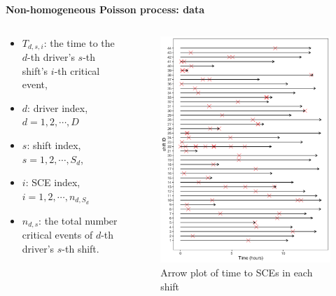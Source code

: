 \begin{frame}{\textbf{Non-homogeneous Poisson process: data}}
\begin{columns}
\begin{column}{.64\textwidth}
\begin{itemize}
\item $T_{d, s, i}$: the time to the $d$-th driver's $s$-th shift's $i$-th critical event,
\item $d$: driver index, $d = 1, 2, \cdots, D$
\item $s$: shift index, $s = 1, 2, \cdots, S_d$,
\item $i$: SCE index, $i = 1, 2, \cdots, n_{d, S_d}$
\item $n_{d,s}$: the total number critical events of $d$-th driver's $s$-th shift. 
\end{itemize}
\end{column}
\hfill
\begin{column}{.35\textwidth}
\begin{figure}
  \includegraphics[width=\textwidth]{Figures/t2events_arrow_plot.png}
  \caption{Arrow plot of time to SCEs in each shift}
\end{figure}
\end{column}
\end{columns}
\end{frame}

